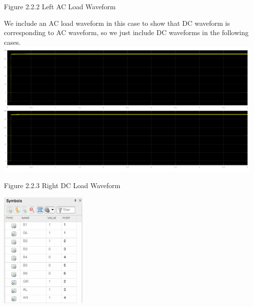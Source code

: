 \documentclass{mcmthesis}
\begin{document}
\begin{center}
\small{Figure 2.2.2 Left AC Load Waveform}
\end{center}
We include an AC load waveform in this case to show that DC waveform is corresponding to AC waveform, so we just include DC waveforms in the following cases.
\\
\includegraphics[trim= 0 0.255\imageheight{} 0 0, clip, width = 0.185\imageheight{}]{all_powered_load2.png}
\begin{center}
\small{Figure 2.2.3 Right DC Load Waveform}
\end{center}
\begin{center}
\includegraphics[width=4.25cm]{all_powered_signals.png}
\end{center}
\end{document}
